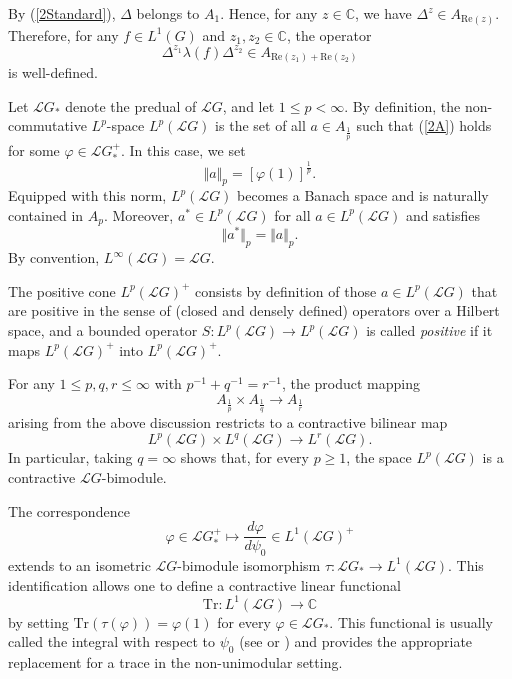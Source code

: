 \documentclass[12pt]{amsart}
\newcommand{\Cdb}{\mbox{$\mathbb{C}$}}
\newcommand{\norm}[1]{\Vert#1\Vert}
\theoremstyle{remark}
\theoremstyle{definition}
\numberwithin{equation}{section}
\begin{document}
By (\ref{2Standard}), $\Delta$ belongs to $A_1$.  
Hence, for any $z \in \Cdb$, we have $\Delta^z \in A_{\mathrm{Re}(z)}$.  
Therefore, for any $f \in L^1(G)$ and $z_1, z_2 \in \Cdb$, the operator
\begin{equation}\label{2Strong}
\Delta^{z_1} \lambda(f) \Delta^{z_2} \in A_{\mathrm{Re}(z_1) + \mathrm{Re}(z_2)}
\end{equation}
is well-defined.

Let ${\mathcal L}G_*$ denote the predual of ${\mathcal L}G$, and let $1 \leq p < \infty$.  
By definition, the non-commutative $L^p$-space $L^p({\mathcal L}G)$ is the set of all $a \in A_{\frac{1}{p}}$ such that (\ref{2A}) holds for some $\varphi \in {\mathcal L}G_*^+$.  
In this case, we set
\[
\norm{a}_p = [\varphi(1)]^{\frac{1}{p}}.
\]  
Equipped with this norm, $L^p({\mathcal L}G)$ becomes a Banach space and is naturally contained in $A_p$. 
Moreover, $a^* \in L^p({\mathcal L}G)$ for all $a \in L^p({\mathcal L}G)$ and satisfies
\[
\norm{a^*}_p = \norm{a}_p.
\]  
By convention, $L^\infty({\mathcal L}G) = {\mathcal L}G$.

The positive cone $L^p({\mathcal L}G)^+$ consists by definition of those $a \in L^p({\mathcal L}G)$ that are positive in the sense of (closed and densely defined) operators over a Hilbert space, and a bounded operator $S \colon L^p({\mathcal L}G) \to L^p({\mathcal L}G)$ is called \emph{positive} if it maps $L^p({\mathcal L}G)^+$ into $L^p({\mathcal L}G)^+$.

For any $1 \leq p,q,r \leq \infty$ with $p^{-1} + q^{-1} = r^{-1}$, the product mapping
\[
A_{\frac{1}{p}} \times A_{\frac{1}{q}} \longrightarrow A_{\frac{1}{r}}
\]
arising from the above discussion restricts to a contractive bilinear map
\[
L^p({\mathcal L}G) \times L^q({\mathcal L}G) \longrightarrow L^r({\mathcal L}G).
\]
In particular, taking $q = \infty$ shows that, for every $p \geq 1$, the space
$L^p({\mathcal L}G)$ is a contractive ${\mathcal L}G$-bimodule.


The correspondence
\[
\varphi \in {\mathcal L}G_*^+ \longmapsto \frac{d\varphi}{d\psi_0} \in L^1({\mathcal L}G)^+
\]
extends to an isometric ${\mathcal L}G$-bimodule isomorphism \(\tau \colon {\mathcal L}G_* \to L^1({\mathcal L}G)\). This identification allows one to define a contractive linear functional
\[
\mathrm{Tr} \colon L^1({\mathcal L}G) \longrightarrow \Cdb
\]
by setting $\mathrm{Tr}(\tau(\varphi)) = \varphi(1)$ for every $\varphi \in {\mathcal L}G_*$. This functional is usually called the integral with respect to $\psi_0$ (see \cite[p.~203]{Hiai} or \cite[p.~554]{Terp2}) and provides the appropriate replacement for a trace in the non-unimodular setting.
\end{document}
